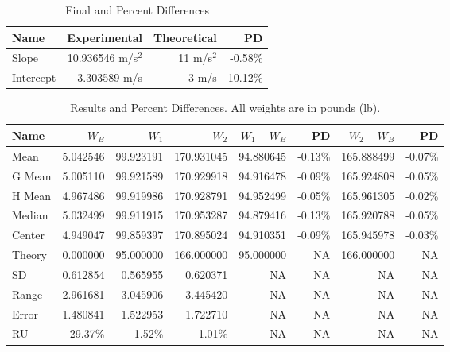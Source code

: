 \begin{table}[ht]
    \centering
    \begin{tabular}{|l|r|r|r|}
        \hline
        \textbf{Name} & \textbf{Experimental} & \textbf{Theoretical} & \textbf{PD} \\
        \hline
        Slope & 10.936546 m/s$^{2}$ & 11 m/s$^{2}$ & -0.58\% \\
        Intercept & 3.303589 m/s & 3 m/s & 10.12\% \\
        \hline
    \end{tabular}
    \caption{Final and Percent Differences}
    \label{table:00.velocity.results}
\end{table}
\begin{table}[ht]
    \centering
    \begin{tabular}{|l|r|r|r|r|r|r|r|}
        \hline
        \textbf{Name} & $W_{B}$ & $W_{1}$ & $W_{2}$ & $W_{1} - W_{B}$ & \textbf{PD} & $W_{2} - W_{B}$ & \textbf{PD} \\
        \hline
        Mean & 5.042546 & 99.923191 & 170.931045 & 94.880645 & -0.13\% & 165.888499 & -0.07\% \\
        G Mean & 5.005110 & 99.921589 & 170.929918 & 94.916478 & -0.09\% & 165.924808 & -0.05\% \\
        H Mean & 4.967486 & 99.919986 & 170.928791 & 94.952499 & -0.05\% & 165.961305 & -0.02\% \\
        Median & 5.032499 & 99.911915 & 170.953287 & 94.879416 & -0.13\% & 165.920788 & -0.05\% \\
        Center & 4.949047 & 99.859397 & 170.895024 & 94.910351 & -0.09\% & 165.945978 & -0.03\% \\
        \hline
        Theory & 0.000000 & 95.000000 & 166.000000 & 95.000000 & NA & 166.000000 & NA \\
        \hline
        SD & 0.612854 & 0.565955 & 0.620371 & NA & NA & NA & NA \\
        Range & 2.961681 & 3.045906 & 3.445420 & NA & NA & NA & NA \\
        Error & 1.480841 & 1.522953 & 1.722710 & NA & NA & NA & NA \\
        RU & 29.37\% & 1.52\% & 1.01\% & NA & NA & NA & NA \\
        \hline
    \end{tabular}
    \caption{Results and Percent Differences. All weights are in pounds (lb).}
    \label{table:00.results}
\end{table}
